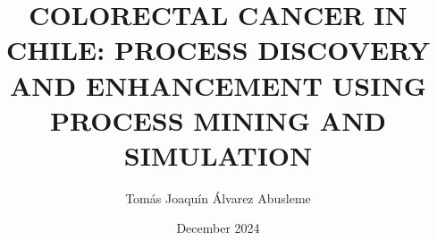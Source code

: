 \documentclass[pdftex]{pucthesis}	%
\begin{document}
    
\title[COLORECTAL CANCER IN CHILE: PROCESS DISCOVERY AND ENHANCEMENT USING PROCESS MINING AND SIMULATION]
   {\bf COLORECTAL CANCER IN CHILE: PROCESS DISCOVERY AND ENHANCEMENT USING PROCESS MINING AND SIMULATION}       
\author[Tomás Álvarez Abusleme]{Tomás Joaquín Álvarez Abusleme}

\address{Escuela de Ingenier\'ia\\
                   Pontificia Universidad Cat\'olica de Chile\\ 
                   Vicu\~na Mackenna 4860\\
                  Santiago, Chile\\
                  {\it Tel.\/} : 56 (2) 354-2000}

\subject{Industrial Engineering}
\date{December 2024}
\dedication{To Camilo Lopez, who would have liked to see this study completed}


\NoChapterPageNumber
{}
\maketitle


\end{document}
